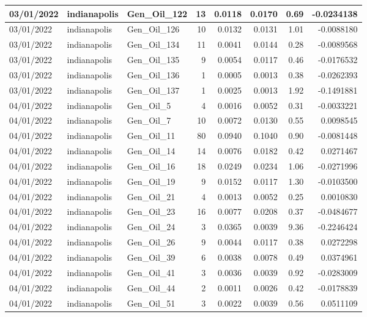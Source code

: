 \documentclass[
  letterpaper,
  DIV=11,
  numbers=noendperiod]{scrartcl}
\begin{document}
\begin{tabular}{l|l|l|r|r|r|r|r}
\hline
03/01/2022 & indianapolis & Gen\_Oil\_122 & 13 & 0.0118 & 0.0170 & 0.69 & -0.0234138\\
\hline
03/01/2022 & indianapolis & Gen\_Oil\_126 & 10 & 0.0132 & 0.0131 & 1.01 & -0.0088180\\
\hline
03/01/2022 & indianapolis & Gen\_Oil\_134 & 11 & 0.0041 & 0.0144 & 0.28 & -0.0089568\\
\hline
03/01/2022 & indianapolis & Gen\_Oil\_135 & 9 & 0.0054 & 0.0117 & 0.46 & -0.0176532\\
\hline
03/01/2022 & indianapolis & Gen\_Oil\_136 & 1 & 0.0005 & 0.0013 & 0.38 & -0.0262393\\
\hline
03/01/2022 & indianapolis & Gen\_Oil\_137 & 1 & 0.0025 & 0.0013 & 1.92 & -0.1491881\\
\hline
04/01/2022 & indianapolis & Gen\_Oil\_5 & 4 & 0.0016 & 0.0052 & 0.31 & -0.0033221\\
\hline
04/01/2022 & indianapolis & Gen\_Oil\_7 & 10 & 0.0072 & 0.0130 & 0.55 & 0.0098545\\
\hline
04/01/2022 & indianapolis & Gen\_Oil\_11 & 80 & 0.0940 & 0.1040 & 0.90 & -0.0081448\\
\hline
04/01/2022 & indianapolis & Gen\_Oil\_14 & 14 & 0.0076 & 0.0182 & 0.42 & 0.0271467\\
\hline
04/01/2022 & indianapolis & Gen\_Oil\_16 & 18 & 0.0249 & 0.0234 & 1.06 & -0.0271996\\
\hline
04/01/2022 & indianapolis & Gen\_Oil\_19 & 9 & 0.0152 & 0.0117 & 1.30 & -0.0103500\\
\hline
04/01/2022 & indianapolis & Gen\_Oil\_21 & 4 & 0.0013 & 0.0052 & 0.25 & 0.0010830\\
\hline
04/01/2022 & indianapolis & Gen\_Oil\_23 & 16 & 0.0077 & 0.0208 & 0.37 & -0.0484677\\
\hline
04/01/2022 & indianapolis & Gen\_Oil\_24 & 3 & 0.0365 & 0.0039 & 9.36 & -0.2246424\\
\hline
04/01/2022 & indianapolis & Gen\_Oil\_26 & 9 & 0.0044 & 0.0117 & 0.38 & 0.0272298\\
\hline
04/01/2022 & indianapolis & Gen\_Oil\_39 & 6 & 0.0038 & 0.0078 & 0.49 & 0.0374961\\
\hline
04/01/2022 & indianapolis & Gen\_Oil\_41 & 3 & 0.0036 & 0.0039 & 0.92 & -0.0283009\\
\hline
04/01/2022 & indianapolis & Gen\_Oil\_44 & 2 & 0.0011 & 0.0026 & 0.42 & -0.0178839\\
\hline
04/01/2022 & indianapolis & Gen\_Oil\_51 & 3 & 0.0022 & 0.0039 & 0.56 & 0.0511109\\

\end{tabular}
\end{document}
